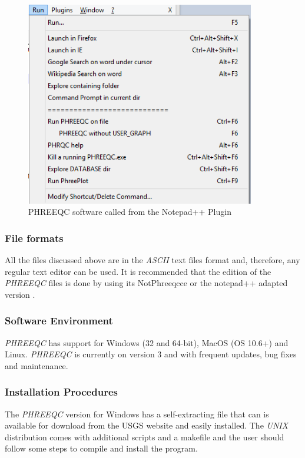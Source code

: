 \documentclass[ppgc,mestrado,english]{iiufrgs}
\begin{document}
\begin{figure}[ht!]
\centering
\includegraphics[width=100mm]{notepad++run_menu.png}
\caption{PHREEQC software called from the Notepad++ Plugin}
\label{fig:phreeqc-notepad++3}
\end{figure}

\subsubsection{File formats}
All the files discussed above are in the \emph{ASCII} text files format and, therefore, any regular text editor can be used. It is recommended that the edition of the \emph{PHREEQC} files is done by using its NotPhreeqcce or the notepad++ adapted version \cite{NotPhree:11}.

\subsubsection{Software Environment}
\emph{PHREEQC} has support for Windows (32 and 64-bit), MacOS (OS 10.6+) and Linux. \emph{PHREEQC} is currently on version 3 and with frequent updates, bug fixes and maintenance.

\subsubsection{Installation Procedures}
The \emph{PHREEQC} version for Windows has a self-extracting file that can is available for download from the USGS website and easily installed. The \emph{UNIX} distribution comes with additional scripts and a makefile and the user should follow some steps to compile and install the program.
\end{document}
